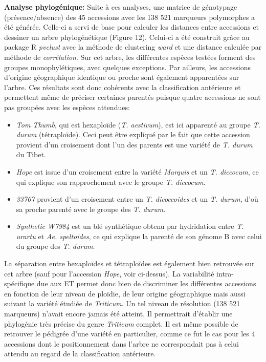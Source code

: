 \documentclass[a4paper, 12pt]{article}
\begin{document}
\begin{onehalfspace}
\textbf{Analyse phylogénique:} Suite à ces analyses, une matrice de génotypage (présence/absence) des 45 accessions avec les 138 521 marqueurs polymorphes a été générée. Celle-ci a servi de base pour calculer les distances entre accessions et dessiner un arbre phylogénétique (Figure 12). Celui-ci a été construit grâce au package R \textit{pvclust} avec la méthode de clustering \textit{ward} et une distance calculée par méthode de \textit{corrélation}. Sur cet arbre, les différentes espèces testées forment des groupes monophylétiques, avec quelques exceptions. Par ailleurs, les accessions d'origine géographique identique ou proche sont également apparentées sur l'arbre. Ces résultats sont donc cohérents avec la classification antérieure et permettent même de préciser certaines parentés puisque quatre accessions ne sont pas groupées avec les espèces attendues:
\begin{itemize}
\item \textit{Tom Thumb}, qui est hexaploïde (\textit{T. aestivum}), est ici apparenté au groupe \textit{T. durum} (tétraploïde). Ceci peut être expliqué par le fait que cette accession provient d'un croisement dont l'un des parents est une variété de \textit{T. durum} du Tibet.
\item \textit{Hope} est issue d'un croisement entre la variété \textit{Marquis} et un \textit{T. diccocum}, ce qui explique son rapprochement avec le groupe \textit{T. diccocum}.
\item \textit{33767} provient d'un croisement entre un \textit{T. dicoccoides} et un \textit{T. durum}, d'où sa proche parenté avec le groupe des \textit{T. durum}.
\item \textit{Synthetic W7984} est un blé synthétique obtenu par hydridation entre \textit{T. urartu} et \textit{Ae. speltoides}, ce qui explique la parenté de son génome B avec celui du groupe des \textit{T. durum}.
\end{itemize}

La séparation entre hexaploïdes et tétraploïdes est également bien retrouvée sur cet arbre (sauf pour l'accession \textit{Hope}, voir ci-dessus). La variabilité intra-spécifique due aux ET permet donc bien de discriminer les différentes accessions en fonction de leur niveau de ploïdie, de leur origine géographique mais aussi suivant la variété étudiée de \textit{Triticum}. Un tel niveau de résolution (138 521 marqueurs) n'avait encore jamais été atteint. Il permettrait d'établir une phylogénie très précise du genre \textit{Triticum} complet. Il est même possible de retrouver le pédigrée d'une variété en particulier, comme ce fut le cas pour les 4 accessions dont le positionnement dans l'arbre ne correspondait pas à celui attendu au regard de la classification antérieure.\\


\end{onehalfspace}
\end{document}
